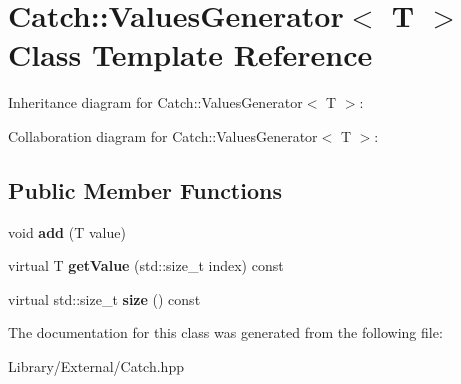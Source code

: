 \hypertarget{class_catch_1_1_values_generator}{}\section{Catch\+:\+:Values\+Generator$<$ T $>$ Class Template Reference}
\label{class_catch_1_1_values_generator}


Inheritance diagram for Catch\+:\+:Values\+Generator$<$ T $>$\+:


Collaboration diagram for Catch\+:\+:Values\+Generator$<$ T $>$\+:
\subsection*{Public Member Functions}
\begin{DoxyCompactItemize}
\item 
\hypertarget{class_catch_1_1_values_generator_a8412c8ce5d9d4fc6ff06d5246d56d538}{}void {\bfseries add} (T value)\label{class_catch_1_1_values_generator_a8412c8ce5d9d4fc6ff06d5246d56d538}

\item 
\hypertarget{class_catch_1_1_values_generator_a60599dd67096ff108471f64ee42acd9d}{}virtual T {\bfseries get\+Value} (std\+::size\+\_\+t index) const \label{class_catch_1_1_values_generator_a60599dd67096ff108471f64ee42acd9d}

\item 
\hypertarget{class_catch_1_1_values_generator_a98a80bb0dd682c44e82e4a75e98c4682}{}virtual std\+::size\+\_\+t {\bfseries size} () const \label{class_catch_1_1_values_generator_a98a80bb0dd682c44e82e4a75e98c4682}

\end{DoxyCompactItemize}


The documentation for this class was generated from the following file\+:\begin{DoxyCompactItemize}
\item 
Library/\+External/Catch.\+hpp\end{DoxyCompactItemize}
